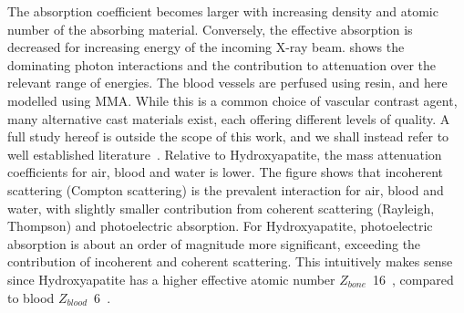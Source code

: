 The absorption coefficient becomes larger with increasing density and atomic
number of the absorbing material. Conversely, the effective absorption is
decreased for increasing energy of the incoming X-ray beam.
 shows the dominating photon interactions and the
contribution to attenuation over the relevant range of energies.  The blood
vessels are perfused using resin, and here modelled using MMA. While this is a
common choice of vascular contrast agent, many alternative cast materials
exist, each offering different levels of quality. A full study hereof is
outside the scope of this work, and we shall instead refer to well established
literature~\cite{resin1,resin2,resin3,resin4,resin5}.  Relative to
Hydroxyapatite, the mass attenuation coefficients for air, blood and water is
lower. The figure shows that incoherent scattering (Compton scattering) is the
prevalent interaction for air, blood and water, with slightly smaller
contribution from coherent scattering (Rayleigh, Thompson) and photoelectric
absorption. For Hydroxyapatite, photoelectric absorption is about an order of
magnitude more significant, exceeding the contribution of incoherent and
coherent scattering. This intuitively makes sense since Hydroxyapatite has a
higher effective atomic number $Z_{bone}$~16~\cite{hydroxyapatite_absorption},
compared to blood $Z_{blood}$~6~\cite{effective_atomic_number}.


